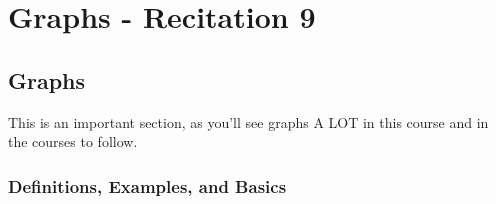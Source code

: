 \chapter{Graphs  - Recitation 9} 

\usetikzlibrary{positioning, arrows}

{}

\def\LinkedList#1{%
  \foreach \element in \list {
     \node[node of list, right = of aux, name=ele] {\element};
     \draw[link] (aux) -- (ele);
     \coordinate (aux) at (ele.east);
  } 
}








\section{Graphs}
This is an important section, as you'll see graphs A LOT in this course and in the courses to follow. 

\subsection{Definitions, Examples, and Basics}

